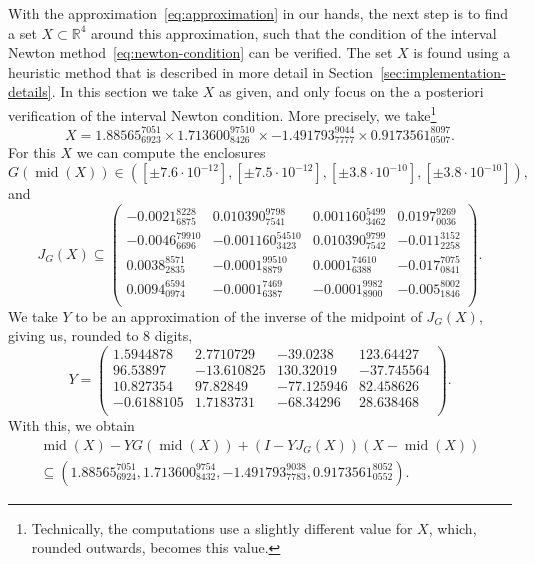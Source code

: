\documentclass[11pt]{article}
\begin{document}
With the approximation~\eqref{eq:approximation} in our hands, the next
step is to find a set \(X \subset \mathbb{R}^{4}\) around this
approximation, such that the condition of the interval Newton
method~\eqref{eq:newton-condition} can be verified. The set \(X\) is
found using a heuristic method that is described in more detail in
Section~\ref{sec:implementation-details}. In this section we take
\(X\) as given, and only focus on the a posteriori verification of the
interval Newton condition. More precisely, we
take\footnote{Technically, the computations use a slightly different
  value for \(X\), which, rounded outwards, becomes this value.}
\begin{equation*}
  X = 1.88565_{6923}^{7051} \times
  1.713600_{8426}^{97510} \times
  -1.491793_{7777}^{9044} \times
  0.9173561_{0507}^{8097}.
\end{equation*}
For this \(X\) we can compute the enclosures
\begin{equation*}
  G(\operatorname{mid}(X)) \in \left([\pm 7.6 \cdot 10^{-12}], [\pm 7.5 \cdot 10^{-12}], [\pm 3.8 \cdot 10^{-10}], [\pm 3.8 \cdot 10^{-10}]\right),
\end{equation*}
and
\begin{equation*}
  J_{G}(X) \subseteq
  \begin{pmatrix}
    -0.0021_{6875}^{8228} & 0.010390_{7541}^{9798} & 0.001160_{3462}^{5499} & 0.0197_{0036}^{9269} \\
    -0.0046_{6696}^{79910} & -0.001160_{3423}^{54510} & 0.010390_{7542}^{9799} & -0.011_{2258}^{3152} \\
    0.0038_{2835}^{8571} & -0.0001_{8879}^{99510} & 0.0001_{6388}^{74610} & -0.017_{0841}^{7075} \\
    0.0094_{0974}^{6594} & -0.0001_{6387}^{7469} & -0.0001_{8900}^{9982} & -0.005_{1846}^{8002} \\
  \end{pmatrix}.
\end{equation*}
We take \(Y\) to be an approximation of the inverse of the midpoint of
\(J_{G}(X)\), giving us, rounded to 8 digits,
\begin{equation*}
  Y =
  \begin{pmatrix}
    1.5944878 & 2.7710729 & -39.0238 & 123.64427 \\
    96.53897 & -13.610825 & 130.32019 & -37.745564 \\
    10.827354 & 97.82849 & -77.125946 & 82.458626 \\
    -0.6188105 & 1.7183731 & -68.34296 & 28.638468 \\
  \end{pmatrix}.
\end{equation*}
With this, we obtain
\begin{multline*}
  \operatorname{mid}(X) - YG(\operatorname{mid}(X)) + (I - YJ_{G}(X))(X - \operatorname{mid}(X))\\\subseteq
  \left(1.88565_{6924}^{7051}, 1.713600_{8432}^{9754}, -1.491793_{7783}^{9038}, 0.9173561_{0552}^{8052}\right).
\end{multline*}
\end{document}
